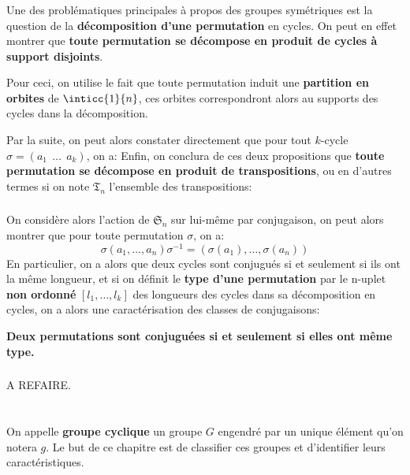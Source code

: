 \subsection*{}
Une des problématiques principales à propos des groupes symétriques est la question de la \textbf{décomposition d'une permutation} en cycles. On peut en effet montrer que \textbf{toute permutation se décompose en produit de cycles à support disjoints}.\<

Pour ceci, on utilise le fait que toute permutation induit une \textbf{partition en orbites} de \( \inticc{1}{n} \), ces orbites correspondront alors au supports des cycles dans la décomposition.\<

Par la suite, on peut alors constater directement que pour tout \(k\)-cycle \(\sigma = (a_1 \;\, \ldots \;\, a_k)\), on a:
Enfin, on conclura de ces deux propositions que \textbf{toute permutation se décompose en produit de transpositions}, ou en d'autres termes si on note \(\mathfrak{T}_n\) l'ensemble des transpositions:
\subsection*{}
On considère alors l'action de \(  \mathfrak{S}_n \) sur lui-même par conjugaison, on peut alors montrer que pour toute permutation \(\sigma\), on a:
\[ 
   \sigma(a_1, \ldots, a_n)\sigma^{-1} = (\sigma(a_1), \ldots, \sigma(a_n))
\]
En particulier, on a alors que deux cycles sont conjugués si et seulement si ils ont la même longueur, et si on définit le \textbf{type d'une permutation} par le n-uplet \textbf{non ordonné} \( [l_1, \ldots, l_k] \) des longueurs des cycles dans sa décomposition en cycles, on a alors une caractérisation des classes de conjugaisons:
\begin{center}
   \textbf{Deux permutations sont conjuguées si et seulement si elles ont même type.}
\end{center}

\subsection*{}
A REFAIRE.

\chapter*{}
On appelle \textbf{groupe cyclique} un groupe \(G\) engendré par un unique élément qu'on notera \(g\). Le but de ce chapitre est de classifier ces groupes et d'identifier leurs caractéristiques.\<

